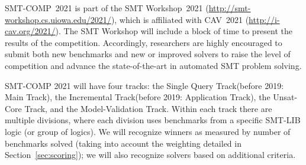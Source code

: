\documentclass[12pt]{article}
\newcommand{\maintrack}{Single Query Track\xspace}
\newcommand{\inctrack}{Incremental Track\xspace}
\newcommand{\ucoretrack}{Unsat-Core Track\xspace}
\newcommand{\mvaltrack}{Model-Validation Track\xspace}
\begin{document}
SMT-COMP~2021 is part of the SMT Workshop~2021
(\url{http://smt-workshop.cs.uiowa.edu/2021/}),
which is affiliated with CAV~2021 (\url{http://i-cav.org/2021/}).
The SMT Workshop will include a block of time to present the results of the
competition.
%
Accordingly, researchers are highly encouraged to submit both new
benchmarks and new or improved solvers to raise the level of
competition and advance the state-of-the-art in automated SMT problem
solving.

SMT-COMP 2021 will have four tracks: the \maintrack (before 2019: Main Track),
the \inctrack (before 2019: Application Track), the \ucoretrack, and the
\mvaltrack.
%
Within each track there are multiple divisions, where each division
uses benchmarks from a specific SMT-LIB logic (or group of logics).
We will recognize winners as measured by number of benchmarks solved
(taking into account the weighting detailed in
Section~\ref{sec:scoring}); we will also recognize solvers based on
additional criteria.
\end{document}
